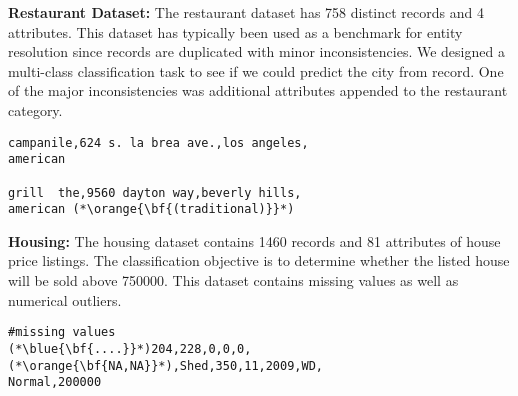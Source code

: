 \vspace{0.5em}\noindent\textbf{Restaurant Dataset: } The restaurant dataset has 758 distinct records and 4 attributes. This dataset has typically been used as a benchmark for entity resolution since records are duplicated with minor inconsistencies.
We designed a multi-class classification task to see if we could predict the city from record.
One of the major inconsistencies was additional attributes appended to the restaurant category.

\begin{lstlisting}
campanile,624 s. la brea ave.,los angeles,
american

grill  the,9560 dayton way,beverly hills,
american (*\orange{\bf{(traditional)}}*)
\end{lstlisting}


\vspace{0.5em}\noindent\textbf{Housing: } The housing dataset contains 1460 records and 81 attributes of house price listings. The classification objective is to determine whether the listed house will be sold above 750000. 
This dataset contains missing values as well as numerical outliers.

\begin{lstlisting}
#missing values
(*\blue{\bf{....}}*)204,228,0,0,0,(*\orange{\bf{NA,NA}}*),Shed,350,11,2009,WD,
Normal,200000
\end{lstlisting}